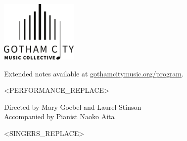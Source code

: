 \documentclass{article}[10pt]
\newcommand{\logo}{
        {\includegraphics[width=0.28\textwidth]{../graphic_design_assets/bw_logo_full}}
}
\newcommand{\tunedspacefront}{\vspace{.26in}}
\newcommand{\tunedspacesmall}{\vspace{0.09in}}
\newcommand{\fleurons}{
        {
        \hfill{}
        \tiny{\textmusicalnote}
        \hspace{0.25in}
        \scriptsize{\textmusicalnote}
        \hspace{0.25in}
        \tiny{\textmusicalnote}
        \hfill{}
    }
}
\begin{document}
    \begin{center}

        \logo

        \tunedspacesmall


        {\normalsize \textbf {}}

        \tunedspacesmall

        {
            \normalsize{
                Extended notes available at
                \href{https://gothamcitymusic.org/program}{gothamcitymusic.org/program}.
            }
        }


        \begin{center}
            \tunedspacefront
            \fleurons
            \vspace{0.1in}
        \end{center}

        \begin{minipage}{\textwidth}
            \begin{flushleft}

                <PERFORMANCE_REPLACE>

            \end{flushleft}
        \end{minipage}

        \begin{center}
            \vspace{0.1in}
            \fleurons
            \tunedspacefront
        \end{center}

        {
            \textbf{}


            \begin{normalsize}
                Directed by
                Mary Goebel
                and
                Laurel Stinson\\
                Accompanied by Pianist Naoko Aita
            \end{normalsize}

            \vspace{0.0in}

            \begin{multicols*}{3}
                \begin{center}
                    \begin{normalsize}
                        <SINGERS_REPLACE>
                    \end{normalsize}
                \end{center}
            \end{multicols*}
        }
    \end{center}
\end{document}
